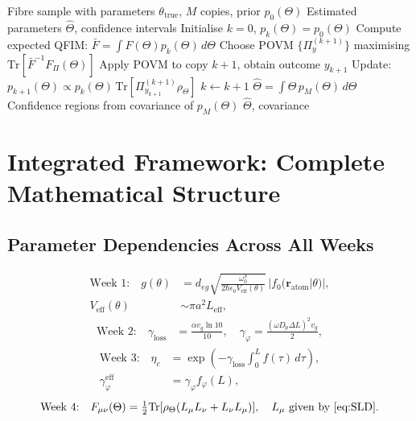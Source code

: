 \documentclass[journal,twocolumn]{IEEEtran}
\theoremstyle{definition}
\theoremstyle{plain}
\newcommand{\Tr}{\mathrm{Tr}}
\begin{document}
\begin{algorithm}[H]
\caption{Channel Parameter Estimation Protocol}
\begin{algorithmic}[1]
\Require Fibre sample with parameters $\theta_{\mathrm{true}}$,
$M$ copies, prior $p_0(\Theta)$
\Ensure Estimated parameters $\hat\Theta$, confidence intervals
\State Initialise $k=0$, $p_k(\Theta)=p_0(\Theta)$
  \State Compute expected QFIM:
    $\bar{F}=\int F(\Theta)p_k(\Theta)\,d\Theta$
  \State Choose POVM $\{\Pi_y^{(k+1)}\}$ maximising
    $\Tr[\bar{F}^{-1}F_\Pi(\Theta)]$
  \State Apply POVM to copy $k+1$, obtain outcome $y_{k+1}$
  \State Update:
    $p_{k+1}(\Theta)\propto p_k(\Theta)\,\Tr[\Pi_{y_{k+1}}^{(k+1)}\rho_\Theta]$
  \State $k\leftarrow k+1$
\EndWhile
\State $\hat\Theta=\int\Theta\,p_M(\Theta)\,d\Theta$
\State Confidence regions from covariance of $p_M(\Theta)$
\Return $\hat\Theta$, covariance
\end{algorithmic}
\end{algorithm}

\section{Integrated Framework: Complete Mathematical Structure}

\subsection{Parameter Dependencies Across All Weeks}

\begin{align}
  \text{Week 1:}\quad g(\theta) &= d_{eg}\sqrt{\frac{\omega_0^3}
    {2\hbar\epsilon_0 V_{\mathrm{eff}}(\theta)}}\,
    |f_0(\mathbf{r}_{\mathrm{atom}}|\theta)|,\nonumber\\
  V_{\mathrm{eff}}(\theta) &\sim \pi a^2 L_{\mathrm{eff}},
\end{align}
\begin{align}
  \text{Week 2:}\quad\gamma_{\mathrm{loss}} &= \frac{\alpha v_g\ln10}{10},\quad
  \gamma_\varphi = \frac{(\omega D_p\Delta L)^2 v_g}{2},
\end{align}
\begin{align}
  \text{Week 3:}\quad\eta_c &= \exp\!\left(-\gamma_{\mathrm{loss}}
    \int_0^L f(\tau)\,d\tau\right),\nonumber\\
  \gamma_\varphi^{\mathrm{eff}} &= \gamma_\varphi f_\varphi(L),
\end{align}
\begin{equation}
  \text{Week 4:}\quad F_{\mu\nu}(\Theta)=
  \tfrac{1}{2}\Tr[\rho_\Theta(L_\mu L_\nu+L_\nu L_\mu)],\quad
  L_\mu\text{ given by \cref{eq:SLD}}.
\end{equation}
\end{document}
